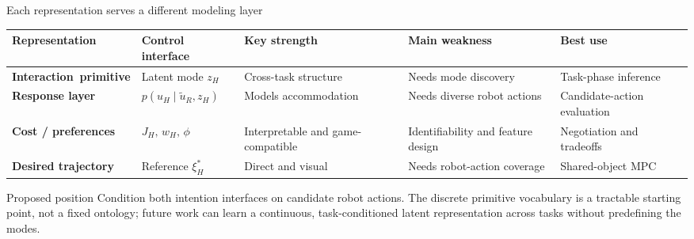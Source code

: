 \documentclass[aspectratio=169,11pt]{beamer}
\begin{document}
\begin{frame}[shrink=4]{Each representation serves a different modeling layer}
\scriptsize
\centering
\renewcommand{\arraystretch}{1.28}
\begin{tabularx}{\textwidth}{>{\bfseries}p{2.9cm}XXXX}
\toprule
Representation & Control interface & Key strength & Main weakness & Best use \\
\midrule
\mbox{Interaction primitive} & Latent mode $z_H$ & Cross-task structure & Needs mode discovery & Task-phase inference \\
Response layer & $p(u_H\mid \tilde u_R,z_H)$ & Models accommodation & Needs diverse robot actions & Candidate-action evaluation \\
Cost / preferences & $J_H,\,w_H,\,\phi$ & Interpretable and game-compatible & Identifiability and feature design & Negotiation and tradeoffs \\
Desired trajectory & Reference $\xi_H^*$ & Direct and visual & Needs robot-action coverage & Shared-object MPC \\
\bottomrule
\end{tabularx}
\vspace{0.32cm}
\begin{alertblock}{Proposed position}
Condition both intention interfaces on candidate robot actions. The discrete primitive vocabulary is a tractable starting point, not a fixed ontology; future work can learn a continuous, task-conditioned latent representation across tasks without predefining the modes.
\end{alertblock}
\end{frame}
\end{document}
